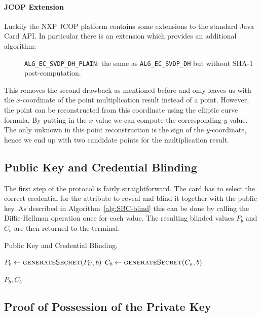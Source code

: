 \paragraph{JCOP Extension}

Luckily the NXP JCOP platform contains some extensions to the standard Java Card
API. In particular there is an extension which provides an additional algorithm:
\begin{description}
  \item[] \texttt{ALG\_EC\_SVDP\_DH\_PLAIN}: the same as
    \texttt{ALG\_EC\_SVDP\_DH} but without SHA-1 post-computation.
\end{description}
This removes the second drawback as mentioned before and only leaves us with the
$x$-coordinate of the point multiplication result instead of a point. However,
the point can be reconstructed from this coordinate using the elliptic curve
formula. By putting in the $x$ value we can compute the corresponding $y$ value.
The only unknown in this point reconstruction is the sign of the $y$-coordinate,
hence we end up with two candidate points for the multiplication result.

\subsection{Public Key and Credential Blinding}

The first step of the protocol is fairly straightforward. The card has to
select the correct credential for the attribute to reveal and blind it together
with the public key. As described in Algorithm~\ref{alg:SBC-blind} this can be
done by calling the Diffie-Hellman operation once for each value. The resulting
blinded values $P_b$ and $C_b$ are then returned to the terminal.

\begin{algorithm}
  \caption{Public Key and Credential Blinding.}
  \label{alg:SBC-blind}
  \addtolength{\baselineskip}{1mm}
  \begin{algorithmic}[1]
      \State $P_b \gets \Call{generateSecret}{P_U, b}$
      \State $C_b \gets \Call{generateSecret}{C_a, b}$

      \Return $P_b, C_b$
    \EndFunction
  \end{algorithmic}
\end{algorithm}

\subsection{Proof of Possession of the Private Key}

